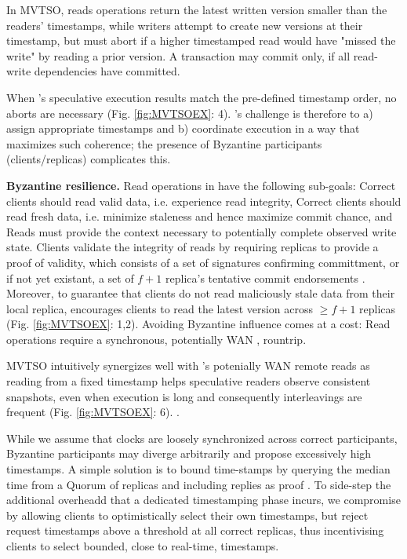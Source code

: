 In MVTSO, reads operations return the latest written version smaller than the readers' timestamps, while writers attempt to create new versions at their timestamp, but must abort if a higher timestamped read would have "missed the write" by reading a prior version. A transaction may commit only, if all read-write dependencies have committed.
\fi

When \sys{}'s speculative execution results match the pre-defined timestamp order, no aborts are necessary (Fig. \ref{fig:MVTSOEX}: 4). \sys{}'s challenge is therefore to a) assign appropriate timestamps and b) coordinate execution in a way that maximizes such coherence; the presence of Byzantine participants (clients/replicas) complicates this.

\par \textbf{Byzantine resilience.} Read operations in \sys have the following sub-goals: \one Correct clients should read valid data, i.e. experience read integrity, \two Correct clients should read fresh data, i.e. minimize staleness and hence maximize commit chance, and \three Reads must provide the context necessary to potentially complete observed write state. 
Clients validate the integrity of reads by requiring replicas to provide a proof of validity, which consists of a set of signatures confirming committment, or if not yet existant, a set of  $f+1$ replica's tentative commit endorsements . Moreover, to guarantee that clients do not read maliciously stale data from their local replica, \sys encourages clients to read the latest version across $\geq f+1$ replicas (Fig. \ref{fig:MVTSOEX}: 1,2).
Avoiding Byzantine influence comes at a cost: Read operations require a synchronous, potentially WAN , rountrip. 

MVTSO intuitively synergizes well with \sys{}'s potenially WAN remote reads as reading from a fixed timestamp helps speculative readers observe consistent snapshots, even when execution is long and consequently interleavings are frequent (Fig. \ref{fig:MVTSOEX}: 6). .

While we assume that clocks are loosely synchronized across correct participants, Byzantine participants may diverge arbitrarily and propose excessively high timestamps. A simple solution is to bound time-stamps by querying the median time from a Quorum of replicas and including replies as proof \cite{bazzi2004non, bazzi2018clairvoyant}. To side-step the additional overheadd that a dedicated timestamping phase incurs, we compromise by allowing clients to optimistically select their own timestamps, but reject request timestamps above a threshold at all correct replicas, thus incentivising clients to select bounded, close to real-time, timestamps. 


